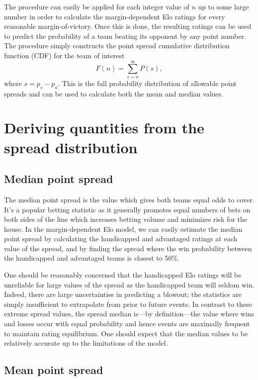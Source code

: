 \documentclass[aps,prc,reprint,amsmath,superscriptaddress]{revtex4-1}
\begin{document}
The procedure can easily be applied for each integer value of $n$ up to some large number in order to calculate the margin-dependent Elo ratings for every reasonable margin-of-victory.
Once this is done, the resulting ratings can be used to predict the probability of a team beating its opponent by any point number.
The procedure simply constructs the point spread cumulative distribution function (CDF) for the team of interest
\begin{equation}
  \label{cdf}
  F(n) = \sum_{s=n}^\infty P(s),
\end{equation}
where $s = p_s - p_a$.
This is the full probability distribution of allowable point spreads and can be used to calculate both the mean and median values.

\section{Deriving quantities from the spread distribution}

\subsection{Median point spread}

The median point spread is the value which gives both teams equal odds to cover.
It's a popular betting statistic as it generally promotes equal numbers of bets on both sides of the line which increases betting volume and minimizes risk for the house.
In the margin-dependent Elo model, we can easily estimate the median point spread by calculating the handicapped and advantaged ratings at each value of the spread, and by finding the spread where the win probability between the handicapped and advantaged teams is closest to 50\%.

One should be reasonably concerned that the handicapped Elo ratings will be unreliable for large values of the spread as the handicapped team will seldom win.
Indeed, there are large uncertainties in predicting a blowout; the statistics are simply insufficient to extrapolate from prior to future events.
In contrast to these extreme spread values, the spread median is---by definition---the value where wins and losses occur with equal probability and hence events are maximally frequent to maintain rating equilibrium.
One should expect that the median values to be relatively accurate up to the limitations of the model.

\subsection{Mean point spread}
\end{document}
